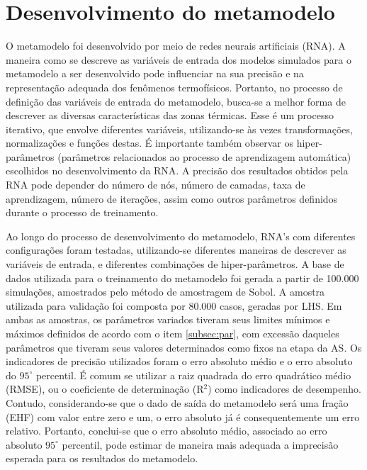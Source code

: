\documentclass[brazil,hardcopy,openany,a5paper]{ufscthesis}
\begin{document}
		\section{Desenvolvimento do metamodelo}
		
		O metamodelo foi desenvolvido por meio de redes neurais artificiais (RNA).		
		A maneira como se descreve as variáveis de entrada dos modelos simulados para o metamodelo a ser desenvolvido pode influenciar na sua precisão e na representação adequada dos fenômenos termofísicos.
		Portanto, no processo de definição das variáveis de entrada do metamodelo, busca-se a melhor forma de descrever as diversas características das zonas térmicas.
		Esse é um processo iterativo, que envolve diferentes variáveis, utilizando-se às vezes transformações, normalizações e funções destas. 
		É importante também observar os hiper-parâmetros (parâmetros relacionados ao processo de aprendizagem automática) escolhidos no desenvolvimento da RNA. 
		A precisão dos resultados obtidos pela RNA pode depender do número de nós, número de camadas, taxa de aprendizagem, número de iterações, assim como outros parâmetros definidos durante o processo de treinamento. 
		
		Ao longo do processo de desenvolvimento do metamodelo, RNA's com diferentes configurações foram testadas, utilizando-se diferentes maneiras de descrever as variáveis de entrada, e diferentes combinações de hiper-parâmetros.
		A base de dados utilizada para o treinamento do metamodelo foi gerada a partir de 100.000 simulações, amostrados pelo método de amostragem de Sobol.
		A amostra utilizada para validação foi composta por 80.000 casos, geradas por LHS.
		Em ambas as amostras, os parâmetros variados tiveram seus limites mínimos e máximos definidos de acordo com o item \ref{subsec:par}, com excessão daqueles parâmetros que tiveram seus valores determinados como fixos na etapa da AS.
		Os indicadores de precisão utilizados foram o erro absoluto médio e o erro absoluto do $95^{\circ}$ percentil.
		É comum se utilizar a raiz quadrada do erro quadrático médio (RMSE), ou o coeficiente de determinação (R$^2$) como indicadores de desempenho. Contudo, considerando-se que o dado de saída do metamodelo será uma fração (EHF) com valor entre zero e um, o erro absoluto já é consequentemente um erro relativo. Portanto, conclui-se que o erro absoluto médio, associado ao erro absoluto $95^{\circ}$ percentil, pode estimar de maneira mais adequada a imprecisão esperada para os resultados do metamodelo.
		
\end{document}
